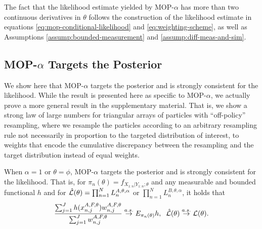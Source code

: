 \documentclass[9pt,twocolumn,twoside]{pnas-new}
\begin{document}
The fact that the likelihood estimate yielded by MOP-$\alpha$ has more than two continuous derivatives in $\theta$ follows the construction of the likelihood estimate in equations \ref{eq:mop-conditional-likelihood} and \ref{eq:weighting-scheme}, as well as Assumptions \ref{assump:bounded-measurement} and \ref{assump:diff-meas-and-sim}. 

\subsection{MOP-$\alpha$ Targets the Posterior}


We show here that MOP-$\alpha$ targets the posterior and is strongly consistent for the likelihood. While the result is presented here as specific to MOP-$\alpha$, we actually prove a more general result in the supplementary material. That is, we show a strong law of large numbers for triangular arrays of particles with ``off-policy'' resampling, where we resample the particles according to an arbitrary resampling rule not necessarily in proportion to the targeted distribution of interest, to weights that encode the cumulative discrepancy between the resampling and the target distribution instead of equal weights.


\begin{thm}
    \label{thm:mop-targeting}
    When $\alpha=1$ or $\theta=\phi$, MOP-$\alpha$ targets the posterior and is strongly consistent for the likelihood. That is, for $\pi_n(\theta)=f_{X_{1:n}|Y_{1:n} ; \theta}$ and any measurable and bounded functional $h$ and for $\hat{\mathcal{L}}(\theta) = \prod_{n=1}^N L_n^{A,\theta,\alpha}$ or $\prod_{n=1}^N L_n^{B,\theta,\alpha}$, it holds that
    \vspace*{-2.5mm}
    \begin{equation}
        \frac{\sum_{j=1}^J h(x_{n,j}^{A,F, \theta}) w_{n,j}^{A,F,\theta}}{\sum_{j=1}^J w_{n,j}^{A,F,\theta}} \stackrel{a.s.}{\to} E_{\pi_n(\theta)} h, \;\; \hat\lik(\theta)  \stackrel{a.s.}{\to} \lik(\theta).
    \vspace*{-2.5mm}
    \end{equation}
\end{thm}
\end{document}
